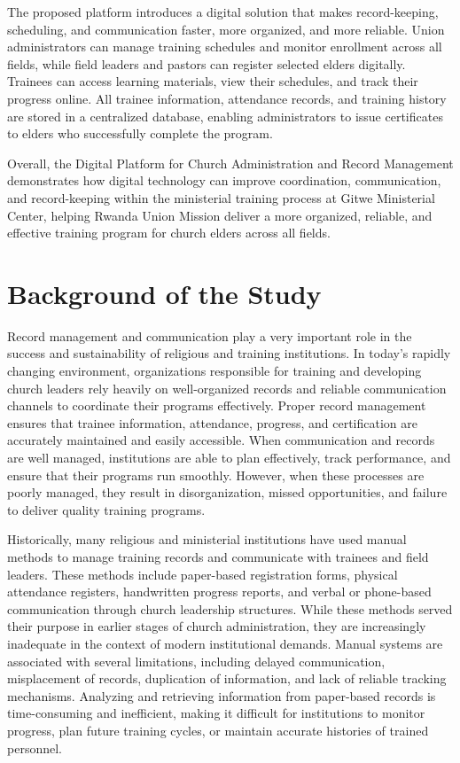\documentclass[12pt]{report}
\begin{document}
The proposed platform introduces a digital solution that makes record-keeping, scheduling, and communication faster, more organized, and more reliable. Union administrators can manage training schedules and monitor enrollment across all fields, while field leaders and pastors can register selected elders digitally. Trainees can access learning materials, view their schedules, and track their progress online. All trainee information, attendance records, and training history are stored in a centralized database, enabling administrators to issue certificates to elders who successfully complete the program.

Overall, the Digital Platform for Church Administration and Record Management demonstrates how digital technology can improve coordination, communication, and record-keeping within the ministerial training process at Gitwe Ministerial Center, helping Rwanda Union Mission deliver a more organized, reliable, and effective training program for church elders across all fields.

\section{Background of the Study}
Record management and communication play a very important role in the success and sustainability of religious and training institutions. In today's rapidly changing environment, organizations responsible for training and developing church leaders rely heavily on well-organized records and reliable communication channels to coordinate their programs effectively. Proper record management ensures that trainee information, attendance, progress, and certification are accurately maintained and easily accessible. When communication and records are well managed, institutions are able to plan effectively, track performance, and ensure that their programs run smoothly. However, when these processes are poorly managed, they result in disorganization, missed opportunities, and failure to deliver quality training programs.

Historically, many religious and ministerial institutions have used manual methods to manage training records and communicate with trainees and field leaders. These methods include paper-based registration forms, physical attendance registers, handwritten progress reports, and verbal or phone-based communication through church leadership structures. While these methods served their purpose in earlier stages of church administration, they are increasingly inadequate in the context of modern institutional demands. Manual systems are associated with several limitations, including delayed communication, misplacement of records, duplication of information, and lack of reliable tracking mechanisms. Analyzing and retrieving information from paper-based records is time-consuming and inefficient, making it difficult for institutions to monitor progress, plan future training cycles, or maintain accurate histories of trained personnel.
\end{document}
